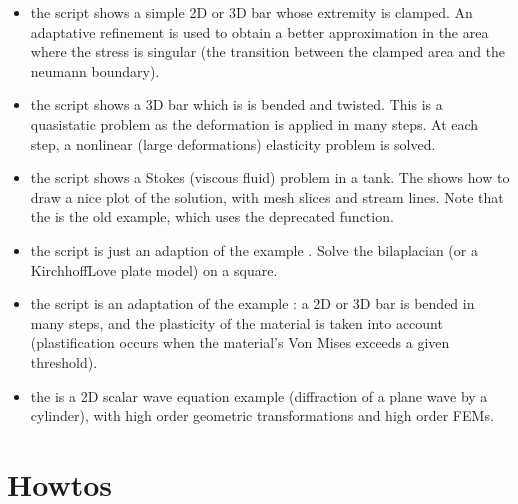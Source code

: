 \documentclass[a4paper,11pt,english]{sphinxmanual}
\begin{document}
\label{\detokenize{python/examples:other-examples}}\begin{itemize}
\item {} 
the  script shows a simple 2D or 3D bar whose extremity
is clamped. An adaptative refinement is used to obtain a better approximation
in the area where the stress is singular (the transition between the clamped
area and the neumann boundary).

\item {} 
the  script shows a 3D bar which is is
bended and twisted. This is a quasi\sphinxhyphen{}static problem as the deformation is
applied in many steps. At each step, a non\sphinxhyphen{}linear (large deformations)
elasticity problem is solved.

\item {} 
the  script shows a Stokes (viscous fluid)
problem in a tank. The  shows how to draw
a nice plot of the solution, with mesh slices and stream lines. Note that the
 is the old example, which uses the
deprecated  function.

\item {} 
the  script is just an adaption of the 
example . Solve the bilaplacian (or a
Kirchhoff\sphinxhyphen{}Love plate model) on a square.

\item {} 
the  script is an adaptation of the  example
: a 2D or 3D bar is bended in many steps, and the
plasticity of the material is taken into account (plastification occurs when
the material’s Von Mises exceeds a given threshold).

\item {} 
the  is a 2D scalar wave equation example (diffraction
of a plane wave by a cylinder), with high order geometric transformations and
high order FEMs.

\end{itemize}


\chapter{How\sphinxhyphen{}tos}
\label{\detokenize{python/howtos:how-tos}}\label{\detokenize{python/howtos:howtos}}\label{\detokenize{python/howtos::doc}}
\end{document}
